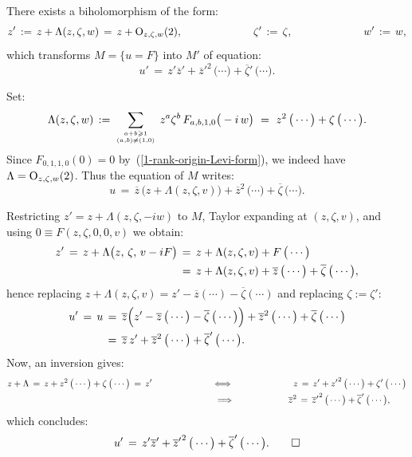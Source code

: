 \documentclass[12pt,twoside,leqno,openany]{amsart}
\begin{document}
\begin{Lemma}
There exists a biholomorphism of the form:
\[
z'
\,:=\,
z
+
\Lambda(z,\zeta,w)
\,=\,
z
+
{\rm O}_{z,\zeta,w}(2),
\ \ \ \ \ \ \ \ \ \ \ \ \ \ \ \ \ \ \ \
\zeta'
\,:=\,
\zeta,
\ \ \ \ \ \ \ \ \ \ \ \ \ \ \ \ \ \ \ \
w'
\,:=\,
w,
\]
which transforms $M = \{ u = F\}$ into $M'$ of equation:
\[
u'
\,=\,
z'\overline{z}'
+
{\overline{z}'}^2\,
\big(\cdots\big)
+
\overline{\zeta}'\,
\big(\cdots\big).
\]
\end{Lemma}

\proof
Set:
\[
\Lambda(z,\zeta,w)
\,:=\,
\sum_{a+b\geqslant 1
\atop
(a,b)\neq(1,0)}\,
z^a\zeta^b\,
F_{a,b,1,0}\big(-i\,w\big)
\,\,=\,\,
z^2\,\big(\cdots\big)
+
\zeta\,\big(\cdots\big).
\]
Since $F_{0,1,1,0}(0) = 0$ 
by~({\ref{1-rank-origin-Levi-form}}),
we indeed have $\Lambda = 
{\rm O}_{z,\zeta,w}(2)$. Thus the equation of $M$ writes:
\[
u
\,=\,
\overline{z}\,
\big(
z
+
\Lambda(z,\zeta,v)
\big)
+
\overline{z}^2\,\big(\cdots\big)
+
\overline{\zeta}\,\big(\cdots\big).
\]

Restricting $z' = z + \Lambda (z, \zeta, -iw)$ 
to $M$, Taylor expanding at
$(z, \zeta, v)$, and using 
$0 \equiv F(z,\zeta, 0, 0, v)$
we obtain:
\[
\aligned
z'
\,=\,
z
+
\Lambda\big(z,\,\zeta,\,v-iF\big)
&
\,=\,
z
+
\Lambda(z,\zeta,v)
+
F\,\big(\cdots\big)
\\
&
\,=\,
z
+
\Lambda(z,\zeta,v)
+
\overline{z}\,
\big(\cdots\big)
+
\overline{\zeta}\,
\big(\cdots\big),
\endaligned
\]
hence replacing $z + \Lambda(z,\zeta,v) = 
z' - \overline{z}(\cdots) - \overline{\zeta}(\cdots)$ 
and replacing $\zeta := \zeta'$:
\[
\aligned
u'
\,=\,
u
&
\,=\,
\overline{z}
\Big(
z'
-
\overline{z}\,\big(\cdots\big)
-
\overline{\zeta}\,\big(\cdots\big)
\Big)
+
\overline{z}^2\,\big(\cdots\big)
+
\overline{\zeta}\,\big(\cdots\big)
\\
&
\,=\,
\overline{z}\,z'
+
\overline{z}^2\,\big(\cdots\big)
+
\overline{\zeta}'\,\big(\cdots\big).
\endaligned
\]
Now, an inversion gives:
\[
\aligned
z
+
\Lambda
\,=\,
z
+
z^2\,\big(\cdots\big)
+
\zeta\,\big(\cdots\big)
\,=\,
z'
\ \ \ \ \ \ \ \ \ \ \ \ \ \ \ \ \ \ \ \
&
\Longleftrightarrow
\ \ \ \ \ \ \ \ \ \ \ \ \ \ \ \ \ \ \ \
z
\,=\,
z'
+
{z'}^2\,\big(\cdots\big)
+
\zeta'\,\big(\cdots\big)
\\
&\,\,
\Longrightarrow
\ \ \ \ \ \ \ \ \ \ \ \ \ \ \ \ \ \ 
\overline{z}^2
\,=\,
\overline{z}'}^2\,\big(\cdots\big)
+
{\overline{\zeta}'\,\big(\cdots\big),
\endaligned
\]
which concludes:
\[
u'
\,=\,
z'\overline{z}'
+
{\overline{z}'}^2\,\big(\cdots\big)
+
\overline{\zeta}'\,\big(\cdots\big).
\qedhere
\]
\endproof
\end{document}
